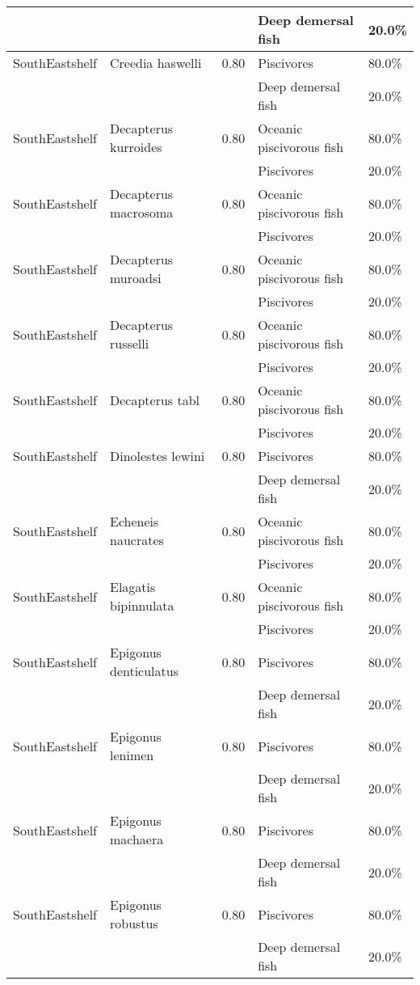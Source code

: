 \begin{longtable}{llcll}
& & & Deep demersal fish & 20.0\% \\
\hline
SouthEastshelf & Creedia haswelli & 0.80 & Piscivores & 80.0\% \\
& & & Deep demersal fish & 20.0\% \\
\hline
SouthEastshelf & Decapterus kurroides & 0.80 & Oceanic piscivorous fish & 80.0\% \\
& & & Piscivores & 20.0\% \\
\hline
SouthEastshelf & Decapterus macrosoma & 0.80 & Oceanic piscivorous fish & 80.0\% \\
& & & Piscivores & 20.0\% \\
\hline
SouthEastshelf & Decapterus muroadsi & 0.80 & Oceanic piscivorous fish & 80.0\% \\
& & & Piscivores & 20.0\% \\
\hline
SouthEastshelf & Decapterus russelli & 0.80 & Oceanic piscivorous fish & 80.0\% \\
& & & Piscivores & 20.0\% \\
\hline
SouthEastshelf & Decapterus tabl & 0.80 & Oceanic piscivorous fish & 80.0\% \\
& & & Piscivores & 20.0\% \\
\hline
SouthEastshelf & Dinolestes lewini & 0.80 & Piscivores & 80.0\% \\
& & & Deep demersal fish & 20.0\% \\
\hline
SouthEastshelf & Echeneis naucrates & 0.80 & Oceanic piscivorous fish & 80.0\% \\
& & & Piscivores & 20.0\% \\
\hline
SouthEastshelf & Elagatis bipinnulata & 0.80 & Oceanic piscivorous fish & 80.0\% \\
& & & Piscivores & 20.0\% \\
\hline
SouthEastshelf & Epigonus denticulatus & 0.80 & Piscivores & 80.0\% \\
& & & Deep demersal fish & 20.0\% \\
\hline
SouthEastshelf & Epigonus lenimen & 0.80 & Piscivores & 80.0\% \\
& & & Deep demersal fish & 20.0\% \\
\hline
SouthEastshelf & Epigonus machaera & 0.80 & Piscivores & 80.0\% \\
& & & Deep demersal fish & 20.0\% \\
\hline
SouthEastshelf & Epigonus robustus & 0.80 & Piscivores & 80.0\% \\
& & & Deep demersal fish & 20.0\% \\

\end{longtable}
